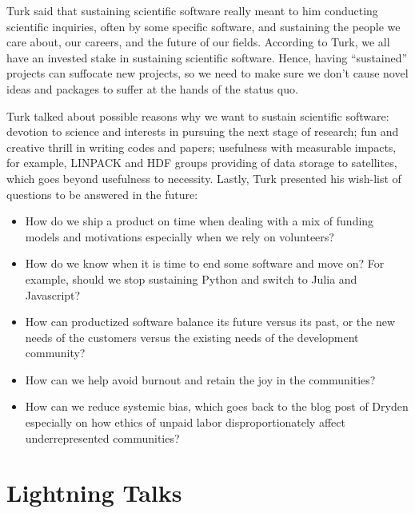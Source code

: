 \documentclass[11pt, oneside]{amsart}
\newcommand{\note}[1]{ {\textcolor{blueish}    { ***Note:      #1 }}}
\begin{document}
Turk said that sustaining scientific software really meant to him conducting
scientific inquiries, often by some specific software, and sustaining the people
we care about, our careers, and the future of our fields. According to Turk, we
all have an invested stake in sustaining scientific software. Hence, having
``sustained'' projects can suffocate new projects, so we need to make sure
we don't cause novel ideas and packages to suffer at the hands of the status quo.

Turk talked about possible reasons why we want to sustain scientific
software: devotion to science and interests in pursuing the next stage of
research; fun and creative thrill in writing codes and papers; usefulness with
measurable impacts, for example, LINPACK and HDF groups providing of data
storage to satellites, which goes beyond usefulness to necessity. Lastly, Turk
presented his wish-list of questions to be answered in the future: 
%
\begin{itemize} 

\item How do we ship a product on time when dealing with a mix of funding models
and motivations especially when we rely on volunteers?

\item How do we know when it is time to end some software and move on? For
example, should we stop sustaining Python and switch to Julia and Javascript?
 
\item How can productized software balance its future versus its past, or the new
needs of the customers versus the existing needs of the development community?

\item How can we help avoid burnout and retain the joy in the communities?

\item How can we reduce systemic bias, which goes back to the blog post of
Dryden especially on how ethics of unpaid labor disproportionately affect
underrepresented communities?

\end{itemize}

\section{Lightning Talks} \label{sec:lightning}
\begin{comment}
\note{
\href{http://wssspe.researchcomputing.org.uk/wssspe3/agenda/}{Slides.}}
\end{comment}
\end{document}
